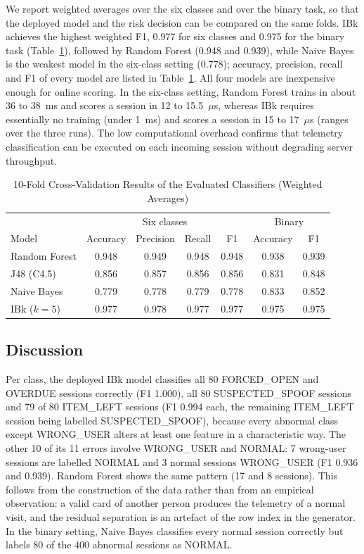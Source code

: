 We report weighted averages over the six classes and over the binary task, so that the deployed model and the risk
decision can be compared on the same folds. IBk achieves the highest weighted F1, 0.977 for six classes and 0.975 for
the binary task (Table~\ref{tab:ml}), followed by Random Forest (0.948 and 0.939), while Naive Bayes is the weakest model in the six-class setting (0.778); accuracy, precision, recall and F1 of every model are listed in Table~\ref{tab:ml}. All four models are inexpensive enough for online scoring. In the six-class
setting, Random Forest trains in about 36 to 38~ms and scores a session in 12 to 15.5~$\mu$s, whereas IBk requires
essentially no training (under 1~ms) and scores a session in 15 to 17~$\mu$s (ranges over the three runs). The low
computational overhead confirms that telemetry classification can be executed on each incoming session without
degrading server throughput.

\begin{table}[!htbp]
\renewcommand{\arraystretch}{1.1}
\centering
\small
\caption{10-Fold Cross-Validation Results of the Evaluated Classifiers (Weighted Averages)}
\label{tab:ml}
\begin{tabular}{l c c c c c c}
\hline
 & \multicolumn{4}{c}{Six classes} & \multicolumn{2}{c}{Binary} \\
Model & Accuracy & Precision & Recall & F1 & Accuracy & F1 \\
\hline
Random Forest & 0.948 & 0.949 & 0.948 & 0.948 & 0.938 & 0.939 \\
J48 (C4.5)    & 0.856 & 0.857 & 0.856 & 0.856 & 0.831 & 0.848 \\
Naive Bayes   & 0.779 & 0.778 & 0.779 & 0.778 & 0.833 & 0.852 \\
IBk ($k=5$)   & 0.977 & 0.978 & 0.977 & 0.977 & 0.975 & 0.975 \\
\hline
\end{tabular}
\end{table}

\subsection{Discussion}

Per class, the deployed IBk model classifies all 80 FORCED\_OPEN and OVERDUE sessions correctly (F1 1.000), all 80
SUSPECTED\_SPOOF sessions and 79 of 80 ITEM\_LEFT sessions (F1 0.994 each, the remaining ITEM\_LEFT session being
labelled SUSPECTED\_SPOOF), because every abnormal class except WRONG\_USER alters at least one feature in a
characteristic way. The other 10 of its 11 errors involve WRONG\_USER and NORMAL: 7 wrong-user sessions are labelled
NORMAL and 3 normal sessions WRONG\_USER (F1 0.936 and 0.939). Random Forest shows the same
pattern (17 and 8 sessions). This follows from the construction of the data rather than from an empirical observation:
a valid card of another person produces the telemetry of a normal visit, and the residual separation is an artefact of
the row index in the generator. In the binary setting, Naive Bayes classifies every normal session correctly but
labels 80 of the 400 abnormal sessions as NORMAL.

